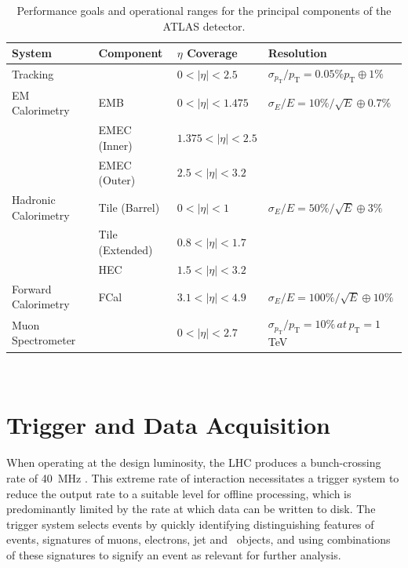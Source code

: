 	  	\begin{table}[ht]
	  		\caption[Performance goals and operational ranges of the ATLAS detector]{Performance goals and operational ranges for the principal components of the ATLAS detector. \cite{ATLAS}}
	  		\label{tab:d:operational}
	  		\medskip
	  		\centering
	  		\begin{tabular}{llll}\toprule
	  			System & Component & $\eta$ Coverage & Resolution \\\midrule
	  			Tracking &  & $0<|\eta|<2.5$ & $\sigma_{p_\text{T}}/p_\text{T} = 0.05\% p_\text{T}\oplus1\%$\\
	  			EM Calorimetry & EMB & $0<|\eta|<1.475$ & $\sigma_{E}/E = 10\%/\sqrt{E} \oplus0.7\%$ \\
	  			& EMEC (Inner) & $1.375<|\eta|<2.5$ &  \\
	  			& EMEC (Outer) & $2.5<|\eta|<3.2$ &  \\
	  			Hadronic Calorimetry & Tile (Barrel) & $0<|\eta|<1$ & $\sigma_{E}/E = 50\%/\sqrt{E} \oplus3\%$ \\
	  			& Tile (Extended) & $0.8<|\eta|<1.7$ &  \\
	  			 & HEC & $1.5<|\eta|<3.2$ &  \\
	  			Forward Calorimetry & FCal & $3.1<|\eta|<4.9$ & $\sigma_{E}/E = 100\%/\sqrt{E} \oplus10\%$ \\
	  			Muon Spectrometer &  &  $0<|\eta|<2.7$  & $\sigma_{p_\text{T}}/p_\text{T} = 10\%\,at\,p_\text{T}=1$ TeV  \\\bottomrule
	  		\end{tabular}\\[5pt]
	  	\end{table}

\section{Trigger and Data Acquisition}

	When operating at the design luminosity, the LHC produces a bunch-crossing rate of 40~MHz \cite{trigrun2017}. This extreme rate of interaction necessitates a trigger system to reduce the output rate to a suitable level for offline processing, which is predominantly limited by the rate at which data can be written to disk. The trigger system selects events by quickly identifying distinguishing features of events, signatures of muons, electrons, jet and \bjet\, objects, and using combinations of these signatures to signify an event as relevant for further analysis.

